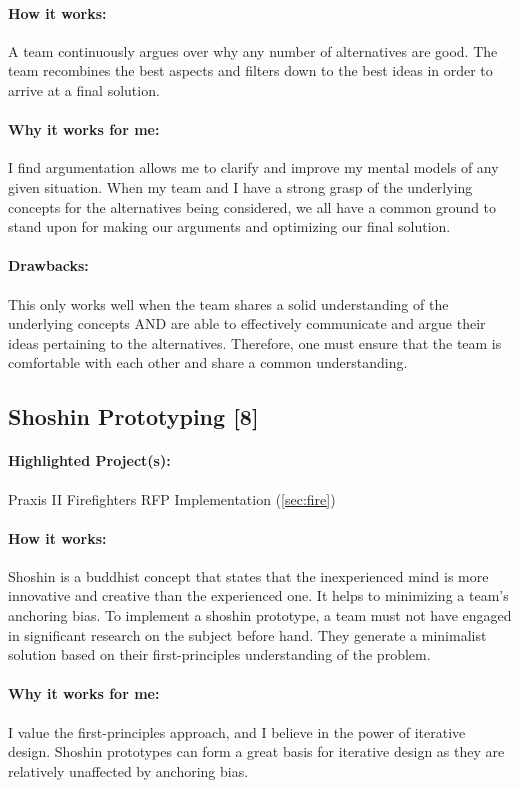 \documentclass[a4paper,12pt]{article}
\begin{document}
\paragraph{How it works: }
A team continuously argues over why any number of alternatives are good. The team recombines the best aspects and filters down to the best ideas in order to arrive at a final solution.

\paragraph{Why it works for me: }
I find argumentation allows me to clarify and improve my mental models of any given situation. When my team and I have a strong grasp of the underlying concepts for the alternatives being considered, we all have a common ground to stand upon for making our arguments and optimizing our final solution.

\paragraph{Drawbacks: }
This only works well when the team shares a solid understanding of the underlying concepts AND are able to effectively communicate and argue their ideas pertaining to the alternatives. Therefore, one must ensure that the team is comfortable with each other and share a common understanding.

\subsection{Shoshin Prototyping [8]}
\label{sec:shoshin}
\paragraph{Highlighted Project(s): } Praxis II Firefighters RFP Implementation (\ref{sec:fire})
\paragraph{How it works: }
Shoshin is a buddhist concept that states that the inexperienced mind is more innovative and creative than the experienced one. It helps to minimizing a team’s anchoring bias. To implement a shoshin prototype, a team must not have engaged in significant research on the subject before hand. They generate a minimalist solution based on their first-principles understanding of the problem.

\paragraph{Why it works for me: }
I value the first-principles approach, and I believe in the power of iterative design. Shoshin prototypes can form a great basis for iterative design as they are relatively unaffected by anchoring bias.
\end{document}
